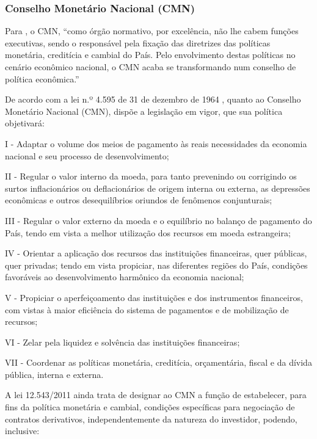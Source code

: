 \documentclass[
	10pt,				%
	openright,			%
	twoside,			%
	a5paper,			%
	english,			%
	french,				%
	spanish,			%
	brazil				%
	]{abntex2}
\begin{document}
\subsubsection{Conselho Monetário Nacional
(CMN)}\label{conselho-monetuxe1rio-nacional-cmn}

Para , o CMN, ``como órgão normativo, por
excelência, não lhe cabem funções executivas, sendo o responsável pela
fixação das diretrizes das políticas monetária, creditícia e cambial do
País. Pelo envolvimento destas políticas no cenário econômico nacional,
o CMN acaba se transformando num conselho de política econômica.''

De acordo com a lei n.º 4.595 de 31 de dezembro de 1964
\cite[art. 3º]{brasil1964c}, quanto ao Conselho Monetário Nacional
(CMN), dispõe a legislação em vigor, que sua política objetivará:

I - Adaptar o volume dos meios de pagamento às reais necessidades da
economia nacional e seu processo de desenvolvimento;

II - Regular o valor interno da moeda, para tanto prevenindo ou
corrigindo os surtos inflacionários ou deflacionários de origem interna
ou externa, as depressões econômicas e outros desequilíbrios oriundos de
fenômenos conjunturais;

III - Regular o valor externo da moeda e o equilíbrio no balanço de
pagamento do País, tendo em vista a melhor utilização dos recursos em
moeda estrangeira;

IV - Orientar a aplicação dos recursos das instituições financeiras,
quer públicas, quer privadas; tendo em vista propiciar, nas diferentes
regiões do País, condições favoráveis ao desenvolvimento harmônico da
economia nacional;

V - Propiciar o aperfeiçoamento das instituições e dos instrumentos
financeiros, com vistas à maior eficiência do sistema de pagamentos e de
mobilização de recursos;

VI - Zelar pela liquidez e solvência das instituições financeiras;

VII - Coordenar as políticas monetária, creditícia, orçamentária, fiscal
e da dívida pública, interna e externa.

A lei 12.543/2011 \cite[art. 1º]{brasil2011} ainda trata de designar ao
CMN a função de estabelecer, para fins da política monetária e cambial,
condições específicas para negociação de contratos derivativos,
independentemente da natureza do investidor, podendo, inclusive:
\end{document}
